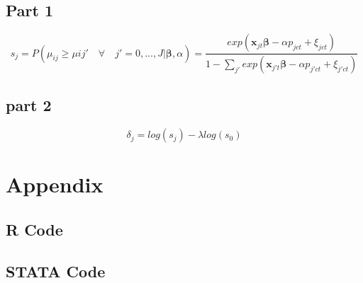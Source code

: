 \documentclass[11pt]{article}
\begin{document}
\subsection{Part 1}

$$
s_j = P(\mu_{ij} \geq  \mu{ij'} \quad \forall \quad j' = 0,..., J | \bm{\beta}, \alpha) 
=  \frac{exp(\bm x_{jt} \bm \beta - \alpha p_{jct} + \xi_{jct})}{1-\sum_{j'}exp(\bm x_{j't} \bm \beta - \alpha p_{j'ct} + \xi_{j'ct})}
$$

\subsection{part 2}

$$ \delta_j = log(s_j) - \lambda log(s_0)
$$





\section{Appendix}
\subsection{R Code}


\subsection{STATA Code}




\end{document}
